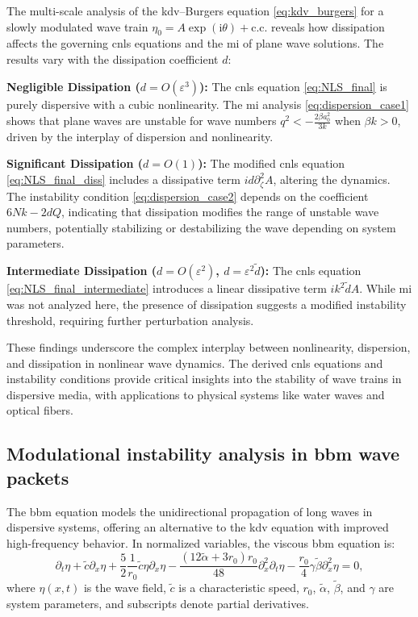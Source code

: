 \documentclass[alpha-refs, 12pt]{wiley-article}
\newcommand{\ui}{\mathrm{i}}
\newcommand{\eps}{\varepsilon}
\begin{document}
The multi-scale analysis of the \acrshort{kdv}--Burgers equation \eqref{eq:kdv_burgers} for a slowly modulated wave train $\eta_0 = A \exp(\ui \theta) + \text{c.c.}$ reveals how dissipation affects the governing \acrfull{cnls} equations and the \acrshort{mi} of plane wave solutions. The results vary with the dissipation coefficient $d$:

\begin{description}
  \item{\textbf{Negligible Dissipation ($d = O(\eps^3)$):}} The \acrshort{cnls} equation \eqref{eq:NLS_final} is purely dispersive with a cubic nonlinearity. The \acrshort{mi} analysis \eqref{eq:dispersion_case1} shows that plane waves are unstable for wave numbers $q^2 < -\frac{2 \beta a_0^2}{3 k}$ when $\beta k > 0$, driven by the interplay of dispersion and nonlinearity.
  \item{\textbf{Significant Dissipation ($d = O(1)$):}} The modified \acrshort{cnls} equation \eqref{eq:NLS_final_diss} includes a dissipative term $i d \partial_\zeta^2 A$, altering the dynamics. The instability condition \eqref{eq:dispersion_case2} depends on the coefficient $6 N k - 2 d Q$, indicating that dissipation modifies the range of unstable wave numbers, potentially stabilizing or destabilizing the wave depending on system parameters.
  \item{\textbf{Intermediate Dissipation ($d = O(\eps^2)$, $d = \eps^2 \tilde{d}$):}} The \acrshort{cnls} equation \eqref{eq:NLS_final_intermediate} introduces a linear dissipative term $i k^2 \tilde{d} A$. While \acrshort{mi} was not analyzed here, the presence of dissipation suggests a modified instability threshold, requiring further perturbation analysis.
\end{description}
These findings underscore the complex interplay between nonlinearity, dispersion, and dissipation in nonlinear wave dynamics. The derived \acrshort{cnls} equations and instability conditions provide critical insights into the stability of wave trains in dispersive media, with applications to physical systems like water waves and optical fibers.

\subsection{Modulational instability analysis in \acrshort{bbm} wave packets}

The \acrfull{bbm} equation models the unidirectional propagation of long waves in dispersive systems, offering an alternative to the \acrfull{kdv} equation with improved high-frequency behavior. In normalized variables, the viscous \acrshort{bbm} equation is:
\begin{equation}\label{eq:BBM1}
  \partial_t \eta + \tilde{c} \partial_x \eta + \frac{5}{2} \frac{1}{r_0} \tilde{c} \eta \partial_x \eta - \frac{(12 \tilde{\alpha} + 3 r_0) r_0}{48} \partial_x^2 \partial_t \eta - \frac{r_0}{4} \gamma \tilde{\beta} \partial_x^2 \eta = 0,
\end{equation}
where $\eta(x,t)$ is the wave field, $\tilde{c}$ is a characteristic speed, $r_0$, $\tilde{\alpha}$, $\tilde{\beta}$, and $\gamma$ are system parameters, and subscripts denote partial derivatives.
\end{document}
